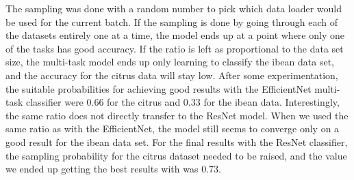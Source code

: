 The sampling was done with a random number to pick which data loader would be used for the current batch.
If the sampling is done by going through each of the datasets entirely one at a time, the model ends up at a point where only one of the tasks has good accuracy.
If the ratio is left as proportional to the data set size, the multi-task model ends up only learning to classify the ibean data set, and the accuracy for the citrus data will stay low.
After some experimentation, the suitable probabilities for achieving good results with the EfficientNet multi-task classifier were 0.66 for the citrus and 0.33 for the ibean data.
Interestingly, the same ratio does not directly transfer to the ResNet model.
When we used the same ratio as with the EfficientNet, the model still seems to converge only on a good result for the ibean data set.
For the final results with the ResNet classifier, the sampling probability for the citrus dataset needed to be raised, and the value we ended up getting the best results with was 0.73.

